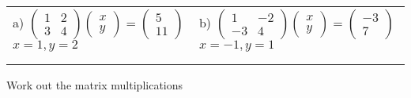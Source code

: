 \documentclass[fontsize=12pt]{scrartcl}
\begin{document}
\begin{tabular}{p{9cm}p{9cm}}
a) $\begin{pmatrix}1&2\\3&4\end{pmatrix}\begin{pmatrix}x\\y\end{pmatrix}=\begin{pmatrix}5\\11\end{pmatrix}$
 \quad $x=1, y=2$
&b) $\begin{pmatrix}1&-2\\-3&4\end{pmatrix}\begin{pmatrix}x\\y\end{pmatrix}=\begin{pmatrix}-3\\7\end{pmatrix}$
 \quad $x=-1, y=1$
\\\\\\
\end{tabular}
\newpage
Work out the matrix multiplications
\newline
\newline
\end{document}
